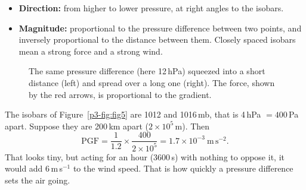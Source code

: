\begin{itemize}
\item \textbf{Direction:} from higher to lower pressure, at right angles to the isobars.
\item \textbf{Magnitude:} proportional to the pressure difference between two points, and inversely proportional to the distance between them. Closely spaced isobars mean a strong force and a strong wind.
\end{itemize}

\begin{figure}[ht]
\centering
{}
\caption{The same pressure difference (here 12\,hPa) squeezed into a short distance (left) and spread over a long one (right). The force, shown by the red arrows, is proportional to the gradient.}
\end{figure}

\begin{workedbox}
The isobars of Figure~\ref{p3-fig:fig5} are 1012 and 1016\,mb, that is 4\,hPa $=400$\,Pa apart. Suppose they are 200\,km apart ($2\times10^5$\,m). Then
\[
\text{PGF}=\frac{1}{1.2}\times\frac{400}{2\times10^{5}}=1.7\times10^{-3}\ \mathrm{m\,s^{-2}}.
\]
That looks tiny, but acting for an hour (3600\,s) with nothing to oppose it, it would add 6\,m\,s$^{-1}$ to the wind speed. That is how quickly a pressure difference sets the air going.
\end{workedbox}

